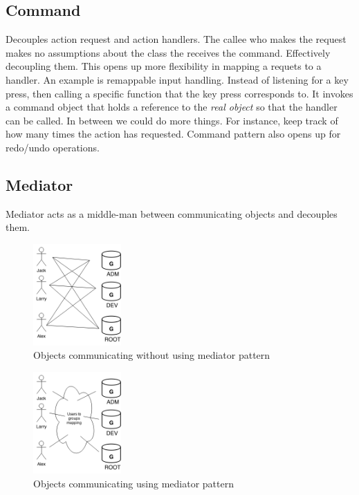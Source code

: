 \documentclass[10pt,letterpaper]{article}
\newcommand{\bs}{\bigskip}
\begin{document}
\begin{multicols}{2}
\subsection{Command}

Decouples action request and action handlers. The callee who makes the request makes no assumptions about the class the receives the command. Effectively decoupling them.
\bs
This opens up more flexibility in mapping a requets to a handler. An example is remappable input handling. Instead of listening for a key press, then calling a specific function that the key press corresponds to. It invokes a command object that holds a reference to the \textit{real object} so that the handler can be called.
\bs
In between we could do more things. For instance, keep track of how many times the action has requested.
\bs
Command pattern also opens up for redo/undo operations.

\subsection{Mediator}\label{ssection:mediator}

Mediator acts as a middle-man between communicating objects and decouples them\cite{sm-mediator}.

\begin{figure}[H]
	\centering
	\includegraphics[width=0.3\textwidth]{assets/mediator_before}
	\caption{Objects communicating without using mediator pattern}
	\label{fig:mediator-before}
\end{figure}

\begin{figure}[H]
	\centering
	\includegraphics[width=0.3\textwidth]{assets/mediator_after}
	\caption{Objects communicating using mediator pattern}
	\label{fig:mediator-after}
\end{figure}


\end{multicols}
\end{document}
